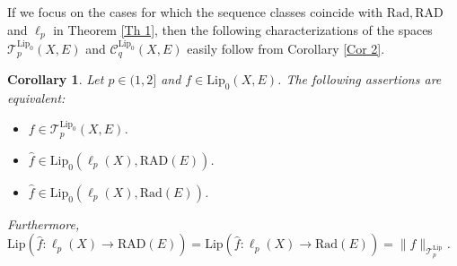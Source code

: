 \documentclass[12pt]{amsart}
\newtheorem{proposition}[theorem]{Proposition}
\newtheorem{corollary}[theorem]{Corollary}
\def\C{\mathcal{C}}
\def\L{\mathcal{L}}
\def\T{\mathcal{T}}
\def\C{\mathcal{C}}
\def\N{\mathbb{N}}
\def\Lip{\mathrm{Lip}_0}
\def\Lipnorm{\mathrm{Lip}}
\def\Rad{\mathrm{Rad}}
\def\RAD{\mathrm{RAD}}
\begin{document}

If we focus on the cases for which the sequence classes coincide with $\Rad, \RAD$ and $\ell_p$ in Theorem \ref{Th 1}, then the following characterizations of the spaces $\T_p^{\Lip}(X,E)$ and $\C_q^{\Lip}(X,E)$ easily follow from Corollary \ref{Cor 2}.

\begin{corollary}\label{Cor 2.6}
	Let $p \in (1,2]$ and $f \in \Lip(X,E)$. The following assertions are equivalent:
	\begin{itemize}
		\item[$(i)$] $f \in \T_p^{\Lip}(X,E)$.
		\item[$(ii)$] $\hat{f} \in\Lip(\ell_p(X),\RAD(E))$.
		\item[$(iii)$] $\hat{f} \in \Lip(\ell_p(X),\Rad(E))$.
	\end{itemize}

	Furthermore, $\Lipnorm(\hat{f}:\ell_p(X) \to \RAD(E)) = \Lipnorm(\hat{f}:\ell_p(X) \to \Rad(E)) = \|f\|_{\T_p^{\Lipnorm}}$.
\end{corollary}
\end{document}
